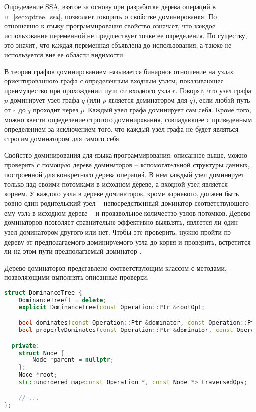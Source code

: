Определение SSA, взятое за основу при разработке дерева операций в п.~\ref{sec:optree_ssa}, позволяет говорить о свойстве доминирования.
По отношению к языку программирования свойство означает, что каждое использование переменной не предшествует точке ее определения.
По существу, это значит, что каждая переменная объявлена до использования, а также не используется вне ее области видимости.

В теории графов доминированием называется бинарное отношение на узлах ориентированного графа с определенным входным узлом, показывающее преимущество при прохождении пути от входного узла \(r\).
Говорят, что узел графа \(p\) доминирует узел графа \(q\) (или \(p\) является доминатором для \(q\)), если любой путь от \(r\) до \(q\) проходит через \(p\).
Каждый узел графа доминирует сам себя.
Кроме того, можно ввести определение строгого доминирования, совпадающее с приведенным определением за исключением того, что каждый узел графа не будет являться строгим доминатором для самого себя.

Свойство доминирования для языка программирования, описанное выше, можно проверить с помощью дерева доминаторов -- вспомогательной структуры данных, построенной для конкретного дерева операций.
В нем каждый узел доминирует только над своими потомками в исходном дереве, а входной узел является корнем.
У каждого узла в дереве доминаторов, кроме корневого, должен быть ровно один родительский узел -- непосредственный доминатор соответствующего ему узла в исходном дереве -- и произвольное количество узлов-потомков.
Дерево доминаторов позволяет сравнительно эффективно выявлять, является ли один узел доминатором другого или нет.
Чтобы это проверить, нужно пройти по дереву от предполагаемого доминируемого узла до корня и проверить, встретится ли на этом пути предполагаемый доминатор \cite{habr_dominance}.

Дерево доминаторов представлено соответствующим классом с методами, позволяющими выполнять описанные проверки.

\begin{lstlisting}[language=C++, caption=Объявление класса DominanceTree]
struct DominanceTree {
    DominanceTree() = delete;
    explicit DominanceTree(const Operation::Ptr &rootOp);

    bool dominates(const Operation::Ptr &dominator, const Operation::Ptr &dominated) const;
    bool properlyDominates(const Operation::Ptr &dominator, const Operation::Ptr &dominated) const;

  private:
    struct Node {
        Node *parent = nullptr;
    };
    Node *root;
    std::unordered_map<const Operation *, const Node *> traversedOps;

    // ...
};
\end{lstlisting}

